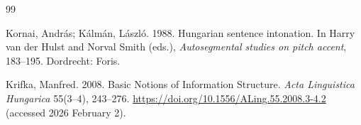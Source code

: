 \documentclass[ruler]{CUP-JNL-LIN}%
\begin{document}
\begin{Backmatter}
\begin{thebibliography}{99}

{Kornai, András; Kálmán, László}. 1988. Hungarian sentence intonation. In Harry van der Hulst and Norval Smith (eds.), \textit{Autosegmental studies on pitch accent}, 183--195. Dordrecht: Foris.




{Krifka, Manfred}. 2008. Basic Notions of Information Structure. \textit{Acta Linguistica Hungarica} 55(3--4), 243--276. \url{https://doi.org/10.1556/ALing.55.2008.3-4.2} (accessed 2026 February 2).




\end{thebibliography}
\end{Backmatter}
\end{document}
